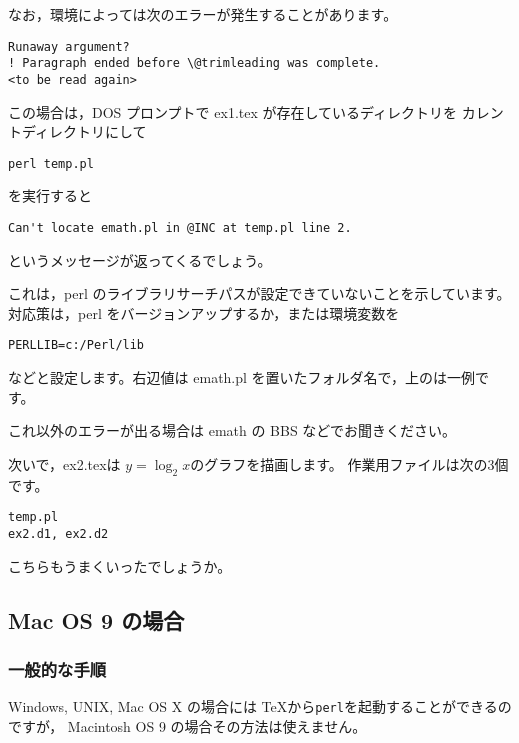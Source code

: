 \documentclass[a4j,fleqn]{jarticle}
\begin{document}
なお，環境によっては次のエラーが発生することがあります。
\begin{jquote}
\begin{verbatim}
Runaway argument?
! Paragraph ended before \@trimleading was complete.
<to be read again> 
\end{verbatim}
\end{jquote}

この場合は，DOS プロンプトで ex1.tex が存在しているディレクトリを
カレントディレクトリにして

\begin{jquote}
\begin{verbatim}
perl temp.pl
\end{verbatim}
\end{jquote}
を実行すると
\begin{jquote}
\begin{verbatim}
Can't locate emath.pl in @INC at temp.pl line 2.
\end{verbatim}
\end{jquote}
というメッセージが返ってくるでしょう。

これは，perl のライブラリサーチパスが設定できていないことを示しています。
対応策は，perl をバージョンアップするか，または環境変数を
\begin{jquote}
\begin{verbatim}
PERLLIB=c:/Perl/lib 
\end{verbatim}
\end{jquote}
などと設定します。右辺値は emath.pl を置いたフォルダ名で，上のは一例です。

これ以外のエラーが出る場合は emath の BBS などでお聞きください。
\fi

次いで，\textsf{ex2.tex}は $y=\log_2{x}$のグラフを描画します。
作業用ファイルは次の3個です。
\begin{jquote}
\begin{verbatim}
temp.pl
ex2.d1, ex2.d2
\end{verbatim}
\end{jquote}

こちらもうまくいったでしょうか。

\subsection{Mac OS 9 の場合}
\subsubsection{一般的な手順}
Windows, UNIX, Mac OS X の場合には \TeX から\texttt{perl}を起動することができるのですが，
Macintosh OS 9 の場合その方法は使えません。
\end{document}
